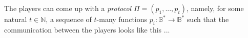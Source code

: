 The players can come up with a \emph{protocol} 
\(\Pi = (p_1, ..., p_t)\),
namely, 
	for some natural $t \in \mathbb{N}$,
	a sequence of $t$-many functions
\(p_i : \mathbb{B}^* \to \mathbb{B}^*\)
such that the communication between the players looks like this ...